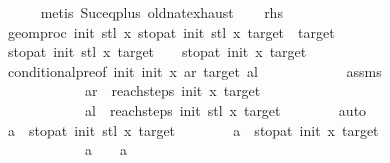\begin{isabellebody}
\ \ \ \ \isamarkupfalse%
\ {\isacharparenleft}{\kern0pt}metis\ Suc{\isacharunderscore}{\kern0pt}eq{\isacharunderscore}{\kern0pt}plus{}\ old{\isachardot}{\kern0pt}nat{\isachardot}{\kern0pt}exhaust{\isacharparenright}{\kern0pt}\isanewline
\ \ \isamarkupfalse%
\ rhs{}\ \isamarkupfalse%
\ {\isachardoublequoteopen}geom{\isacharunderscore}{\kern0pt}proc\ init{\isacharprime}{\kern0pt}\ {\isacharparenleft}{\kern0pt}stl\ x{\isacharparenright}{\kern0pt}\ {\isacharparenleft}{\kern0pt}stop{\isacharunderscore}{\kern0pt}at\ init{\isacharprime}{\kern0pt}\ {\isacharparenleft}{\kern0pt}stl\ x{\isacharparenright}{\kern0pt}\ target{\isacharparenright}{\kern0pt}\ {\isacharequal}{\kern0pt}\ target{\isachardoublequoteclose}\isanewline
\ \ \isamarkupfalse%
{\isacharminus}{\kern0pt}\isanewline
\ \ \ \ \isamarkupfalse%
\ {\isachardoublequoteopen}stop{\isacharunderscore}{\kern0pt}at\ init{\isacharprime}{\kern0pt}\ {\isacharparenleft}{\kern0pt}stl\ x{\isacharparenright}{\kern0pt}\ target\ {\isacharplus}{\kern0pt}\ {}\ {\isacharequal}{\kern0pt}\ stop{\isacharunderscore}{\kern0pt}at\ init\ x\ target{\isachardoublequoteclose}\isanewline
\ \ \ \ \ \ \isamarkupfalse%
\ conditional{}{\isacharunderscore}{\kern0pt}pre{\isacharbrackleft}{\kern0pt}of\ init{\isacharprime}{\kern0pt}\ init\ x\ ar\ target\ al{\isacharbrackright}{\kern0pt}\isanewline
\ \ \ \ \ \ \ \ \ \ \ \ assms\isanewline
\ \ \ \ \ \ \ \ \ \ \ \ {\isacartoucheopen}ar\ {\isacharequal}{\kern0pt}\ reach{\isacharunderscore}{\kern0pt}steps\ init\ x\ target{\isacartoucheclose}\isanewline
\ \ \ \ \ \ \ \ \ \ \ \ {\isacartoucheopen}al\ {\isacharequal}{\kern0pt}\ reach{\isacharunderscore}{\kern0pt}steps\ init{\isacharprime}{\kern0pt}\ {\isacharparenleft}{\kern0pt}stl\ x{\isacharparenright}{\kern0pt}\ target{\isacartoucheclose}\isanewline
\ \ \ \ \ \ \isamarkupfalse%
\ auto\isanewline
\ \ \ \ \isamarkupfalse%
\ \isamarkupfalse%
\ {\isachardoublequoteopen}a\ {\isacharequal}{\kern0pt}\ stop{\isacharunderscore}{\kern0pt}at\ init{\isacharprime}{\kern0pt}\ {\isacharparenleft}{\kern0pt}stl\ x{\isacharparenright}{\kern0pt}\ target{\isachardoublequoteclose}\isanewline
\ \ \ \ \ \ \isamarkupfalse%
\ {\isacartoucheopen}a{\isacharprime}{\kern0pt}\ {\isacharequal}{\kern0pt}\ stop{\isacharunderscore}{\kern0pt}at\ init\ x\ target{\isacartoucheclose}\isanewline
\ \ \ \ \ \ \ \ \ \ \ \ {\isacartoucheopen}a\ {\isacharplus}{\kern0pt}\ {}\ {\isacharequal}{\kern0pt}\ a{\isacharprime}{\kern0pt}{\isacartoucheclose}\isanewline

\end{isabellebody}
